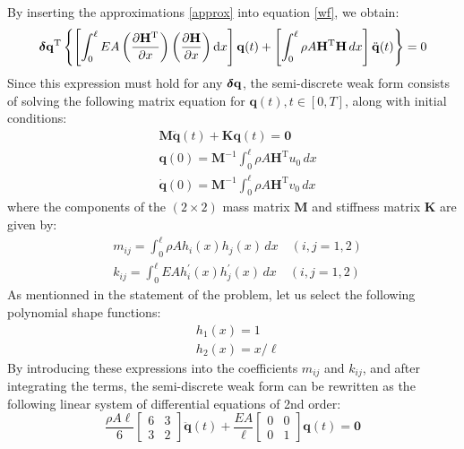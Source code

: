 \documentclass[12pt]{article}
\begin{document}
By inserting the approximations \eqref{approx} into equation \eqref{wf}, we obtain:
\begin{equation*}
    \boldsymbol\delta \mathbf{q}^{\mathrm{T}}\left\{\left[\int_0^{\ell} E A\left(\frac{\partial \mathbf{H}^{\mathrm{T}}}{\partial x}\right)\left(\frac{\partial \mathbf{H}}{\partial x}\right) \mathrm{d} x\right] \mathbf{q}(t)+
    \left[\int_0^{\ell} \rho A \mathbf{H}^{\mathrm{T}} \mathbf{H} \, d x\right] \ddot{\mathbf{q}}(t)\right\}=0
\end{equation*}
Since this expression must hold for any $\boldsymbol\delta \mathbf{q}$, the semi-discrete weak form consists of solving the following matrix equation for $\mathbf{q}(t), t \in[0, T]$, along with initial conditions:
\begin{equation*}
    \begin{aligned}
         & \mathbf{M} \ddot{\mathbf{q}}(t)+\mathbf{K} \mathbf{q}(t)=\mathbf{0}                           \\
         & \mathbf{q}(0)=\mathbf{M}^{-1} \int_0^{\ell} \rho A \mathbf{H}^{\mathrm{T}} u_{0} \, d x       \\
         & \dot{\mathbf{q}}(0)=\mathbf{M}^{-1} \int_0^{\ell} \rho A \mathbf{H}^{\mathrm{T}} v_{0} \, d x
    \end{aligned}
\end{equation*}
where the components of the $(2 \times 2)$ mass matrix $\mathbf{M}$ and stiffness matrix $\mathbf{K}$ are given by:
\begin{equation*}
    \begin{aligned}
         & m_{i j}=\int_0^{\ell} \rho A h_i(x) h_j(x) \, d x \quad (i, j=1,2)              \\
         & k_{i j}=\int_0^{\ell} E A h_{i}^\prime(x)h_{j}^\prime(x)\,  dx \quad (i, j=1,2)
    \end{aligned}
\end{equation*}
As mentionned in the statement of the problem, let us select the following polynomial shape functions:
$$
    \begin{aligned}
         & h_1(x)=1        \\
         & h_2(x)=x / \ell
    \end{aligned}
$$
By introducing these expressions into the coefficients $m_{i j}$ and $k_{i j}$, and after integrating the terms, the semi-discrete weak form can be rewritten as the following linear system of differential equations of 2nd order:
\begin{equation}\label{sdwf}
    \frac{\rho A \ell}{6}\left[\begin{array}{ll}
            6 & 3 \\
            3 & 2
        \end{array}\right] \ddot{\mathbf{q}}(t)+\frac{E A}{\ell}\left[\begin{array}{ll}
            0 & 0 \\
            0 & 1
        \end{array}\right] \mathbf{q}(t)=\mathbf{0}
\end{equation}
\end{document}
